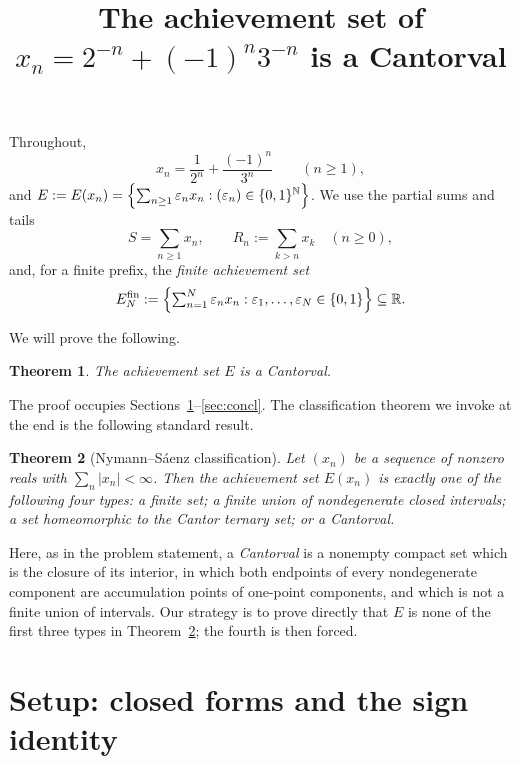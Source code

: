 \documentclass{amsart}
\newtheorem{theorem}{Theorem}
\theoremstyle{definition}
\begin{document}
\title{The achievement set of $x_n=2^{-n}+(-1)^n3^{-n}$ is a Cantorval}
\maketitle

Throughout,
\[
  x_n=\frac{1}{2^n}+\frac{(-1)^n}{3^n}\qquad(n\ge1),
\]
and $E:=E(x_n)=\Bigl\{\sum_{n\ge1}\varepsilon_n x_n:(\varepsilon_n)\in\{0,1\}^{\mathbb N}\Bigr\}$.
We use the partial sums and tails
\[
  S=\sum_{n\ge1}x_n,\qquad R_n:=\sum_{k>n}x_k\quad(n\ge0),
\]
and, for a finite prefix, the \emph{finite achievement set}
\[
  E_N^{\mathrm{fin}}:=\Bigl\{\textstyle\sum_{n=1}^N\varepsilon_n x_n:\varepsilon_1,\dots,\varepsilon_N\in\{0,1\}\Bigr\}\subseteq\mathbb R .
\]

We will prove the following.

\begin{theorem}\label{thm:main}
The achievement set $E$ is a Cantorval.
\end{theorem}

The proof occupies Sections~\ref{sec:setup}--\ref{sec:concl}. The classification theorem we
invoke at the end is the following standard result.

\begin{theorem}[Nymann--S\'aenz classification]\label{thm:NS}
Let $(x_n)$ be a sequence of nonzero reals with $\sum_n|x_n|<\infty$. Then the achievement set
$E(x_n)$ is exactly one of the following four types: a finite set; a finite union of nondegenerate
closed intervals; a set homeomorphic to the Cantor ternary set; or a Cantorval.
\end{theorem}

Here, as in the problem statement, a \emph{Cantorval} is a nonempty compact set which is the
closure of its interior, in which both endpoints of every nondegenerate component are accumulation
points of one-point components, and which is not a finite union of intervals. Our strategy is to
prove directly that $E$ is none of the first three types in Theorem~\ref{thm:NS}; the fourth is then
forced.

\section{Setup: closed forms and the sign identity}\label{sec:setup}
\end{document}
